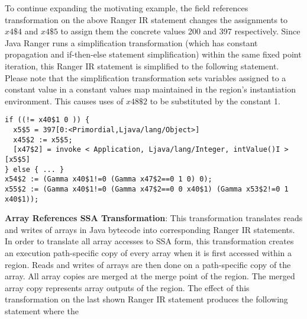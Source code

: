 %
To continue expanding the motivating example, the field references transformation on the above Ranger IR statement
changes the assignments to $x4\$4$ and $x4\$5$ to assign them the concrete values 200 and 397 respectively.
%
Since Java Ranger runs a simplification transformation (which has constant propagation and if-then-else statement
simplification) within the same fixed point iteration, this Ranger IR statement is simplified to the following statement.
%
Please note that the simplification transformation sets variables assigned to a constant value in a constant values
map maintained in the region\rq s instantiation environment.
%
This causes uses of $x48\$2$ to be substituted by the constant 1.
%
\begin{lstlisting}[numbers=none]
if ((!= x40$1 0 )) {
  x5$5 = 397[0:<Primordial,Ljava/lang/Object>]
  x45$2 := x5$5;
  [x47$2] = invoke < Application, Ljava/lang/Integer, intValue()I >[x5$5]
} else { ... }
x54$2 := (Gamma x40$1!=0 (Gamma x47$2==0 1 0) 0);
x55$2 := (Gamma x40$1!=0 (Gamma x47$2==0 0 x40$1) (Gamma x53$2!=0 1 x40$1));
\end{lstlisting}
\textbf{Array References SSA Transformation}: This transformation translates reads and writes of arrays in
Java bytecode into corresponding Ranger IR statements.
%
In order to translate all array accesses to SSA form, this transformation creates an execution path-specific copy of
every array when it is first accessed within a region.
%
Reads and writes of arrays are then done on a path-specific copy of the array.
%
All array copies are merged at the merge point of the region.
%
The merged array copy represents array outputs of the region.
%
The effect of this transformation on the last shown Ranger IR statement produces the following statement where the
